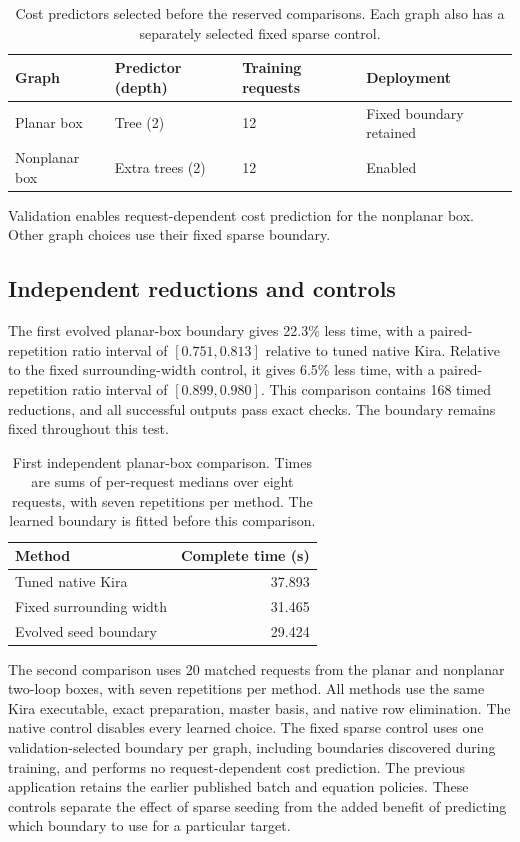 \begin{table}[!htbp]\centering\small
\caption{Cost predictors selected before the reserved comparisons. Each graph also has a separately selected fixed sparse control.}
\label{tab:seed-geometry-models}
\begin{tabular}{@{}llll@{}}\toprule
Graph & Predictor (depth) & Training requests & Deployment\\\midrule
Planar box & Tree (2) & 12 & Fixed boundary retained\\
Nonplanar box & Extra trees (2) & 12 & Enabled\\
\bottomrule\end{tabular}\end{table}

Validation enables request-dependent cost prediction for the nonplanar box. Other graph choices use their fixed sparse boundary.

\subsection{Independent reductions and controls}
The first evolved planar-box boundary gives 22.3\% less time, with a paired-repetition ratio interval of $[0.751, 0.813]$ relative to tuned native Kira. Relative to the fixed surrounding-width control, it gives 6.5\% less time, with a paired-repetition ratio interval of $[0.899, 0.980]$. This comparison contains 168 timed reductions, and all successful outputs pass exact checks. The boundary remains fixed throughout this test.

\begin{table}[!htbp]\centering\small
\caption{First independent planar-box comparison. Times are sums of per-request medians over eight requests, with seven repetitions per method. The learned boundary is fitted before this comparison.}
\label{tab:seed-geometry-initial}
\begin{tabular}{@{}lr@{}}\toprule
Method & Complete time (s)\\\midrule
Tuned native Kira & 37.893\\
Fixed surrounding width & 31.465\\
Evolved seed boundary & 29.424\\
\bottomrule\end{tabular}\end{table}

The second comparison uses 20 matched requests from the planar and nonplanar two-loop boxes, with seven repetitions per method. All methods use the same Kira executable, exact preparation, master basis, and native row elimination. The native control disables every learned choice. The fixed sparse control uses one validation-selected boundary per graph, including boundaries discovered during training, and performs no request-dependent cost prediction. The previous application retains the earlier published batch and equation policies. These controls separate the effect of sparse seeding from the added benefit of predicting which boundary to use for a particular target.

